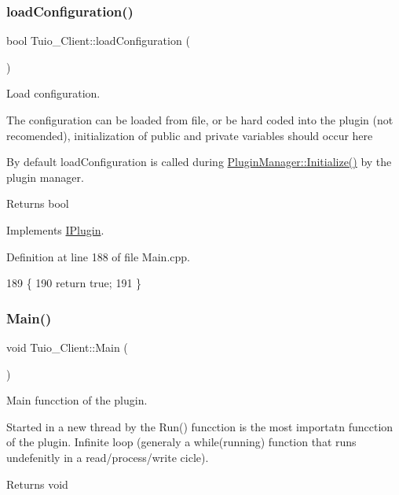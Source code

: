 \subsubsection{\texorpdfstring{load\+Configuration()}{loadConfiguration()}}
{\footnotesize\ttfamily bool Tuio\+\_\+\+Client\+::load\+Configuration (\begin{DoxyParamCaption}{ }\end{DoxyParamCaption})\hspace{0.3cm}{\ttfamily [virtual]}}



Load configuration. 

The configuration can be loaded from file, or be hard coded into the plugin (not recomended), initialization of public and private variables should occur here

By default load\+Configuration is called during \hyperlink{class_plugin_manager_a956e653b7db36da9d034b4a93c8308d5}{Plugin\+Manager\+::\+Initialize()} by the plugin manager.

\begin{DoxyReturn}{Returns}
bool 
\end{DoxyReturn}


Implements \hyperlink{class_i_plugin_a418cff309436d3a15d9a4ce7369db6dd}{I\+Plugin}.



Definition at line 188 of file Main.\+cpp.


\begin{DoxyCode}
189 \{
190     \textcolor{keywordflow}{return} \textcolor{keyword}{true};
191 \}
\end{DoxyCode}
\mbox{\label{class_tuio___client_a13aed5267c36dd0bc9b4dcf6939194d5}} 
\subsubsection{\texorpdfstring{Main()}{Main()}}
{\footnotesize\ttfamily void Tuio\+\_\+\+Client\+::\+Main (\begin{DoxyParamCaption}{ }\end{DoxyParamCaption})\hspace{0.3cm}{\ttfamily [virtual]}}



Main funcction of the plugin. 

Started in a new thread by the Run() funcction is the most importatn funcction of the plugin. Infinite loop (generaly a while(running) function that runs undefenitly in a read/process/write cicle). \begin{DoxyReturn}{Returns}
void 
\end{DoxyReturn}


